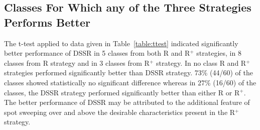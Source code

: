 \subsection{Classes For Which any of the Three Strategies Performs Better}

The t-test applied to data given in Table~\ref{table:ttest} indicated significantly better performance of DSSR in 5 classes from both R and R$^+$ strategies, in 8 classes from R strategy and in 3 classes from R$^+$ strategy. In no class R and R$^+$ strategies performed significantly better than DSSR strategy. 73\% (44/60) of the classes showed statistically no significant difference whereas in 27\% (16/60) of the classes, the DSSR strategy performed significantly better than either R or R$^+$. The better performance of DSSR may be attributed to the additional feature of spot sweeping over and above the desirable characteristics present in the R$^+$ strategy. 






